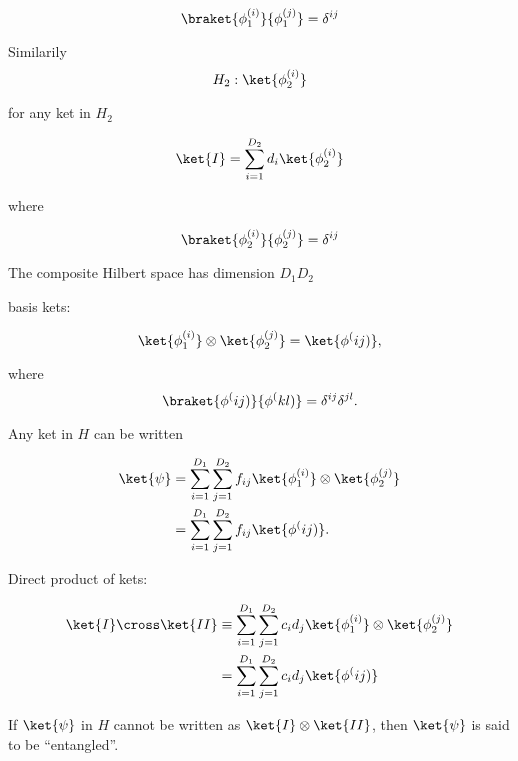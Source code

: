 \begin{equation}\label{eqn:qmTwoL1:n}
\braket{ \phi_1^{(i)}} { \phi_1^{(j)}} = \delta^{i j}
\end{equation}

Similarily
\begin{equation}\label{eqn:qmTwoL1:n}
H_2 : { \ket{\phi_2^{(i)}} }
\end{equation}

for any ket in $H_2$

\begin{equation}\label{eqn:qmTwoL1:n}
\ket{I} = \sum_{i=1}^{D_2} d_i \ket{\phi_2^{(i)}} 
\end{equation}

where

\begin{equation}\label{eqn:qmTwoL1:n}
\braket{ \phi_2^{(i)}} { \phi_2^{(j)}} = \delta^{i j}
\end{equation}

The composite Hilbert space has dimension $D_1 D_2$

basis kets:

\begin{equation}\label{eqn:qmTwoL1:n}
\ket{ \phi_1^{(i)}} \otimes \ket{ \phi_2^{(j)}}  = \ket{ \phi^(ij)},
\end{equation}

where
\begin{equation}\label{eqn:qmTwoL1:n}
\braket{ \phi^(ij)}{ \phi^(kl)} = \delta^{ij} \delta^{jl}.
\end{equation}

Any ket in $H$ can be written

\begin{align*}
\ket{\psi} 
&= 
\sum_{i = 1}^{D_1}
\sum_{j = 1}^{D_2}
f_{ij}
\ket{ \phi_1^{(i)}} \otimes \ket{ \phi_2^{(j)}}  \\
&= 
\sum_{i = 1}^{D_1}
\sum_{j = 1}^{D_2}
f_{ij}
\ket{ \phi^(ij)}.
\end{align*}

Direct product of kets:

\begin{align*}
\ket{I} \cross \ket{II} 
&\equiv
\sum_{i = 1}^{D_1}
\sum_{j = 1}^{D_2}
c_i d_j
\ket{ \phi_1^{(i)}} \otimes \ket{ \phi_2^{(j)}} \\
&=
\sum_{i = 1}^{D_1}
\sum_{j = 1}^{D_2}
c_i d_j
\ket{ \phi^(ij)} 
\end{align*}

If $\ket{\psi}$ in $H$ cannot be written as $\ket{I} \otimes \ket{II}$, then $\ket{\psi}$ is said to be ``entangled''.

